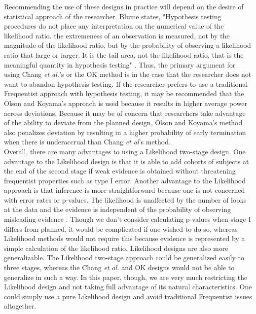 \documentclass[12pt]{report}\usepackage[]{graphicx}\usepackage[]{color}
\newlength{\li}\setlength{\li}{14.48pt}
\newlength{\di}\setlength{\di}{-3.5mm}
\begin{document}
\indent Recommending the use of these designs in practice will depend on the desire of statistical approach of the researcher. Blume states, "Hypothesis testing procedures do not place any interpretation on the numerical value of the likelihood ratio. the extremeness of an observation is measured, not by the magnitude of the likelihood ratio, but by the probability of observing a likelihood ratio that large or larger. It is the tail area, not the likelihood ratio, that is the meaningful quantity in hypothesis testing" \cite{Blume2002}. Thus, the primary argument for using Chang \textit{et al.}'s or the OK method is in the case that the researcher does not want to abandon hypothesis testing.  If the researcher prefers to use a traditional Frequentist approach with hypothesis testing, it may be recommended that the Olson and Koyama's approach is used because it results in higher average power across deviations. Because it may be of concern that researchers take advantage of the ability to deviate from the planned design, Olson and Koyama's method also penalizes deviation by resulting in a higher probability of early termination when there is underaccrual than Chang \textit{et al}'s method. \\
\indent Overall, there are many advantages to using a Likelihood two-stage design. One advantage to the Likelihood design is that it is able to add cohorts of subjects at the end of the second stage if weak evidence is obtained without threatening frequentist properties such as type I error. Another advantage to the Likelihood approach is that inference is more straightforward because one is not concerned with error rates or p-values. The likelihood is unaffected by the number of looks at the data and the evidence is independent of the probability of observing misleading evidence \cite{Blume2002}. Though we don't consider calculating p-values when stage I differs from planned, it would be complicated if one wished to do so, whereas Likelihood methods would not require this because evidence is represented by a simple calculation of the likelihood ratio.  Likelihood designs are also more generalizable. The Likelihood two-stage approach could be generalized easily to three stages, whereas the Chang \textit{et al.} and OK designs would not be able to generalize in such a way. In this paper, though, we are very much restricting the Likelihood design and not taking full advantage of its natural characteristics. One could simply use a pure Likelihood design and avoid traditional Frequentist issues altogether. \\
\end{document}
